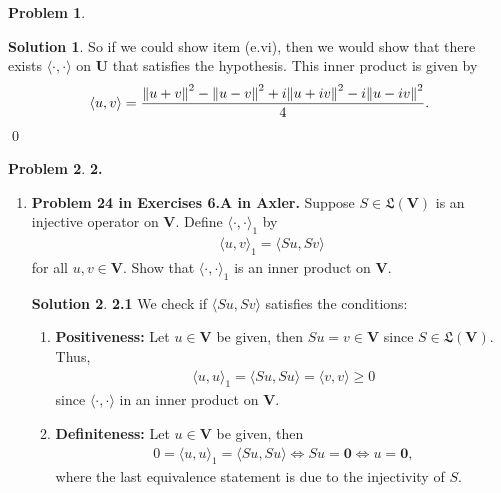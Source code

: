 \documentclass{book}
\theoremstyle{definition}
\newtheorem*{prob*}{Problem}
\newtheorem*{sln*}{Solution}
\newcommand{\V}{\mathbf{V}}
\newcommand{\U}{\mathbf{U}}
\newcommand{\LL}{\mathfrak{L}}
\newcommand{\la}{\langle}
\newcommand{\ra}{\rangle}
\begin{document}
\begin{prob*}
\begin{enumerate}
\begin{sln*}
			
			So if we could show item (e.vi), then we would show that there exists $\la \cdot,\cdot \ra$ on $\U$ that satisfies the hypothesis. This inner product is given by
			\begin{align*}
			\la u,v\ra = \frac{\norm{u+v}^2 - \norm{u-v}^2 +i\norm{u+iv}^2 - i\norm{u-iv}^2}{4}.
			\end{align*}\qed
		\end{sln*}
		
	\end{enumerate}
	
	
\end{prob*}


\newpage



\begin{prob*}\textbf{2.} 
	\begin{enumerate}
		\item \textbf{Problem 24 in Exercises 6.A in Axler.} Suppose $S \in \LL(\V)$ is an injective operator on $\V$. Define $\la \cdot , \cdot \ra_1$ by 
		\begin{align*}
		\la u , v\ra_1 = \la Su, Sv \ra
		\end{align*}  
		for all $u,v\in \V$. Show that $\la \cdot , \cdot \ra_1$ is an inner product on $\V$. 
		
		
		
		\begin{sln*}\textbf{2.1} 
			We check if $\la Su, Sv \ra$ satisfies the conditions:
			\begin{enumerate}
				\item \textbf{Positiveness: }Let $u \in \V$ be given, then $Su = v \in \V$ since $S \in \LL(\V)$. Thus,
				\begin{align*}
				\la u,u \ra_1 = \la Su ,Su \ra = \la v,v \ra \geq 0
				\end{align*}
				since $\la \cdot, \cdot \ra$ in an inner product on $\V$.
				
				\item \textbf{Definiteness: }Let $u\in \V$ be given, then
				\begin{align*}
				0 = \la u,u \ra_1 = \la Su ,Su \ra \iff Su = \mathbf{0} \iff u = \mathbf{0},
				\end{align*}
				where the last equivalence statement is due to the injectivity of $S$. 
				

\end{enumerate}
\end{sln*}
\end{enumerate}
\end{prob*}
\end{document}
